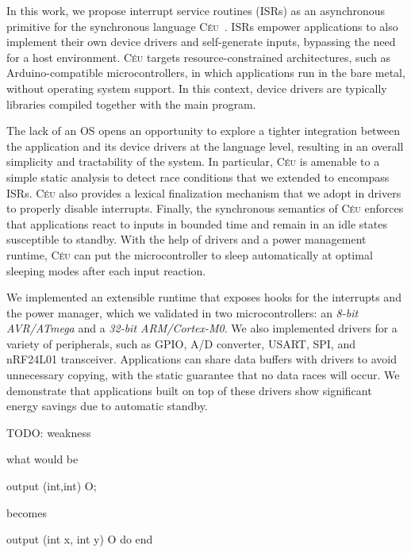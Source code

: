 \documentclass[sigplan,10pt,review,anonymous]{acmart}\settopmatter{printfolios=true,printccs=false,printacmref=false}
\newcommand{\CEU}{\textsc{C\'{e}u}\xspace}
\begin{document}
In this work, we propose interrupt service routines (ISRs) as an asynchronous
primitive for the synchronous language \CEU~\cite{ceu.sensys13}.
ISRs empower applications to also implement their own device drivers and
self-generate inputs, bypassing the need for a host environment.
%
\CEU targets resource-constrained architectures, such as Arduino-compatible
microcontrollers, in which applications run in the bare metal, without
operating system support.
In this context, device drivers are typically libraries compiled together with
the main program.

The lack of an OS opens an opportunity to explore a tighter integration between
the application and its device drivers at the language level, resulting in an
overall simplicity and tractability of the system.
%
In particular, \CEU is amenable to a simple static analysis to detect race
conditions that we extended to encompass ISRs.
%
\CEU also provides a lexical finalization mechanism that we adopt in drivers to
properly disable interrupts.
%
Finally, the synchronous semantics of \CEU enforces that applications react
to inputs in bounded time and remain in an idle states susceptible to standby.
With the help of drivers and a power management runtime, \CEU can put the
microcontroller to sleep automatically at optimal sleeping modes after each
input reaction.

We implemented an extensible runtime that exposes hooks for the interrupts and
the power manager, which we validated in two microcontrollers: an
\emph{8-bit AVR/ATmega} and a \emph{32-bit ARM/Cortex-M0}.
%
We also implemented drivers for a variety of peripherals, such as GPIO, A/D
converter, USART, SPI, and nRF24L01 transceiver.
%
Applications can share data buffers with drivers to avoid unnecessary copying,
with the static guarantee that no data races will occur.
%
We demonstrate that applications built on top of these drivers show significant
energy savings due to automatic standby.

TODO: weakness

what would be

output (int,int) O;

becomes

output (int x, int y) O do
end
\end{document}
